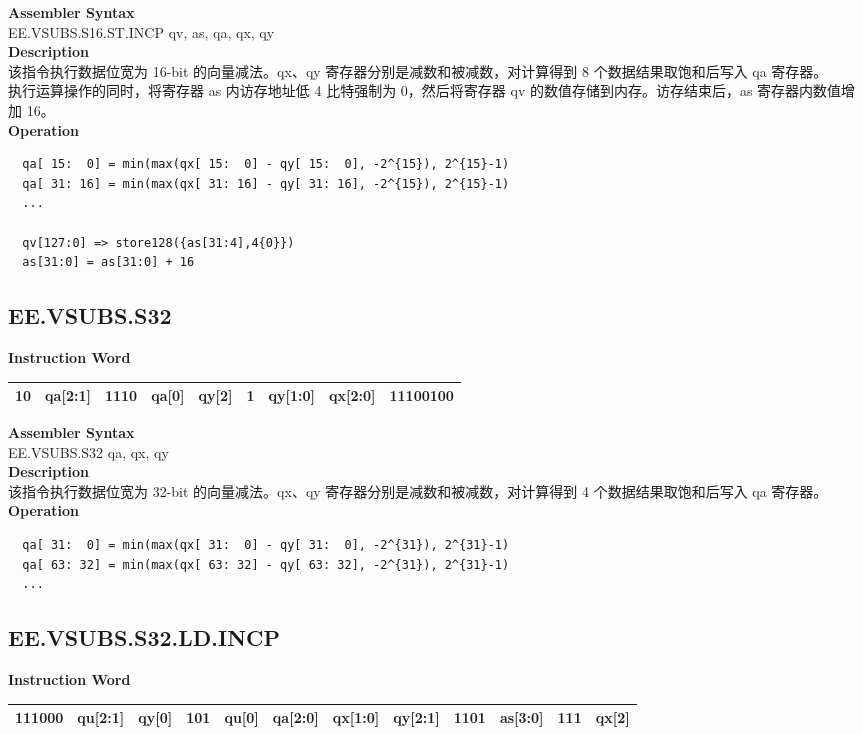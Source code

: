 \textbf{Assembler Syntax} \\
EE.VSUBS.S16.ST.INCP qv, as, qa, qx, qy \\
\textbf{Description} \\
该指令执行数据位宽为 16-bit 的向量减法。qx、qy 寄存器分别是减数和被减数，对计算得到 8 个数据结果取饱和后写入 qa 寄存器。\\ 执行运算操作的同时，将寄存器 as 内访存地址低 4 比特强制为 0，然后将寄存器 qv 的数值存储到内存。访存结束后，as 寄存器内数值增加 16。\\
\textbf{Operation}
\begin{lstlisting}
  qa[ 15:  0] = min(max(qx[ 15:  0] - qy[ 15:  0], -2^{15}), 2^{15}-1)
  qa[ 31: 16] = min(max(qx[ 31: 16] - qy[ 31: 16], -2^{15}), 2^{15}-1)
  ...

  qv[127:0] => store128({as[31:4],4{0}})
  as[31:0] = as[31:0] + 16
\end{lstlisting}

\clearpage
\subsection{EE.VSUBS.S32}\label{instruction:EEVSUBSS32}
\setlength\tabcolsep{6pt}
\textbf{Instruction Word} \\
\begin{tabular}{|c|c|c|c|c|c|c|c|c|}
	\hline
	10 & qa[2:1] & 1110 & qa[0] & qy[2] & 1 & qy[1:0] & qx[2:0] & 11100100 \\
	\hline
\end{tabular}

\textbf{Assembler Syntax} \\
EE.VSUBS.S32 qa, qx, qy \\
\textbf{Description} \\
该指令执行数据位宽为 32-bit 的向量减法。qx、qy 寄存器分别是减数和被减数，对计算得到 4 个数据结果取饱和后写入 qa 寄存器。\\
\textbf{Operation}
\begin{lstlisting}
  qa[ 31:  0] = min(max(qx[ 31:  0] - qy[ 31:  0], -2^{31}), 2^{31}-1)
  qa[ 63: 32] = min(max(qx[ 63: 32] - qy[ 63: 32], -2^{31}), 2^{31}-1)
  ...
\end{lstlisting}

\clearpage
\subsection{EE.VSUBS.S32.LD.INCP}\label{instruction:EEVSUBSS32LDINCP}
\setlength\tabcolsep{6pt}
\textbf{Instruction Word} \\
\begin{tabular}{|c|c|c|c|c|c|c|c|c|c|c|c|}
	\hline
	111000 & qu[2:1] & qy[0] & 101 & qu[0] & qa[2:0] & qx[1:0] & qy[2:1] & 1101 & as[3:0] & 111 & qx[2] \\
	\hline
\end{tabular}


